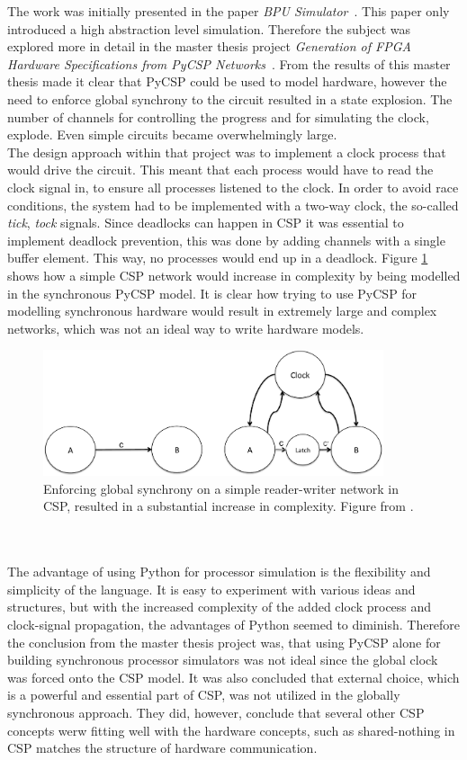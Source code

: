 The work was initially presented in the paper \textit{BPU Simulator}~\cite{Rehr2013}. This paper only introduced a high abstraction level simulation. Therefore the subject was explored more in detail in the master thesis project \textit{Generation of FPGA Hardware
Specifications from PyCSP Networks}~\cite{Skaarup14}. From the results of this master thesis made it clear that PyCSP could be used to model hardware, however the need to enforce global synchrony to the circuit resulted in a state explosion. The number of channels for controlling the progress and for simulating the clock, explode. Even simple circuits became overwhelmingly large.\\

The design approach within that project was to implement a clock process that would drive the circuit. This meant that each process would have to read the clock signal in, to ensure all processes listened to the clock. In order to avoid race conditions, the system had to be implemented with a two-way clock, the so-called \textit{tick}, \textit{tock} signals. Since deadlocks can happen in CSP it was essential to implement deadlock prevention, this was done by adding channels with a single buffer element. This way, no processes would end up in a deadlock. Figure \ref{fig:sme:clock_latch} shows how a simple CSP network would increase in complexity by being modelled in the synchronous PyCSP model. It is clear how trying to use PyCSP for modelling synchronous hardware would result in extremely large and complex networks, which was not an ideal way to write hardware models.
\begin{figure}[h!]
\centering
\includegraphics[width=10.0cm]{figures/clocked.pdf}
\caption{Enforcing global synchrony on a simple reader-writer network in CSP, resulted in a substantial increase in complexity. Figure from \cite{Vinter2014}.}
\label{fig:sme:clock_latch}
\end{figure}
\\\\
The advantage of using Python for processor simulation is the flexibility and simplicity of the language. It is easy to experiment with various ideas and structures, but with the increased complexity of the added clock process and clock-signal propagation, the advantages of Python seemed to diminish. Therefore the conclusion from the master thesis project was, that using PyCSP alone for building synchronous processor simulators was not ideal since the global clock was forced onto the CSP model. It was also concluded that external choice, which is a powerful and essential part of CSP, was not utilized in the globally synchronous approach. They did, however, conclude that several other CSP concepts werw fitting well with the hardware concepts, such as shared-nothing in CSP matches the structure of hardware communication.

